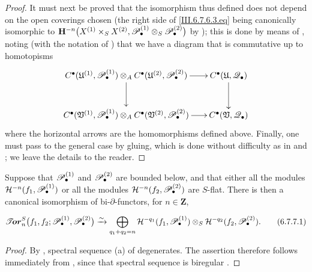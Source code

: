 \begin{proof}
It must next be proved that the isomorphism thus defined does not
depend on the open coverings chosen (the right side of
\eqref{III.6.7.6.3.eq} being canonically isomorphic to $\mathbf{H}^{-n}
\bigl(
X^{(1)}\times_SX^{(2)},
\mathscr{P}_\bullet^{(1)}
\otimes_S\mathscr{P}_\bullet^{(2)}
\bigr)$ by );
this is done by means of , noting (with the
notation of ) that we have a diagram that is commutative up to
homotopisms
\[
\xymatrix@C=18pt@R=28pt{
  C^\bullet(\mathfrak U^{(1)},\sh P_\bullet^{(1)})
  \otimes_A
  C^\bullet(\mathfrak U^{(2)},\sh P_\bullet^{(2)})
  \ar[r]\ar[d]
  &
  C^\bullet(\mathfrak U,\sh Q_\bullet)
  \ar[d]
  \\
  C^\bullet(\mathfrak V^{(1)},\sh P_\bullet^{(1)})
  \otimes_A
  C^\bullet(\mathfrak V^{(2)},\sh P_\bullet^{(2)})
  \ar[r]
  &
  C^\bullet(\mathfrak V,\sh Q_\bullet)
}
\]
where the horizontal arrows are the homomorphisms defined above.  Finally, one
must pass to the general case by gluing, which is done without difficulty as in
 and ; we leave the details to
the reader.
\end{proof}

\begin{proposition}[6.7.7]
\label{III.6.7.7}
Suppose that $\mathscr{P}_\bullet^{(1)}$ and
$\mathscr{P}_\bullet^{(2)}$ are bounded below, and that either all the
modules $\mathcal{H}^{-n}(f_1,\mathscr{P}_\bullet^{(1)})$
\textup{or} all the modules $\mathcal{H}^{-n}(f_2,\mathscr{P}_\bullet^{(2)})$
are $S$-flat.  There is then a canonical isomorphism of
bi-$\partial$-functors, for $n\in\mathbf Z$,
\begin{env}[6.7.7.1]
\label{III.6.7.7.1}
\[
  \boldsymbol{\mathscr{T}\!or}_n^S
  \bigl(
    f_1,f_2;
    \mathscr{P}_\bullet^{(1)},\mathscr{P}_\bullet^{(2)}
  \bigr)
  \xrightarrow{\sim}
  \bigoplus_{q_1+q_2=n}
  \mathcal{H}^{-q_1}(f_1,\mathscr{P}_\bullet^{(1)})
  \otimes_S
  \mathcal{H}^{-q_2}(f_2,\mathscr{P}_\bullet^{(2)}).
  \tag{6.7.7.1}\label{III.6.7.7.1.eq}
\]
\end{env}
\end{proposition}

\begin{proof}
By , spectral sequence \textnormal{(a)} of
 degenerates.  The assertion therefore follows
immediately from , since that spectral sequence
is biregular .
\end{proof}

